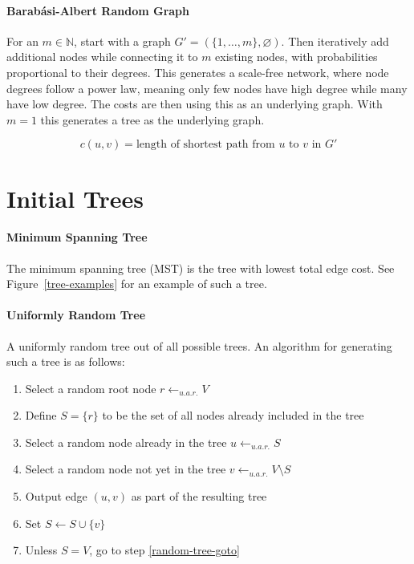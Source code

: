 \documentclass[a4paper, oneside]{discothesis}
\begin{document}
\paragraph{Barabási-Albert Random Graph} For an $m\in\mathbb{N}$, start with a graph $G'=(\{1,\dots,m\},\varnothing)$. Then iteratively add additional nodes while connecting it to $m$ existing nodes, with probabilities proportional to their degrees. This generates a scale-free network, where node degrees follow a power law, meaning only few nodes have high degree while many have low degree. The costs are then using this as an underlying graph. With $m=1$ this generates a tree as the underlying graph.

\begin{equation}
c(u,v)=\text{length of shortest path from $u$ to $v$ in $G'$}
\end{equation}

\section{Initial Trees}
\label{initial-trees}


\paragraph{Minimum Spanning Tree}

The minimum spanning tree (MST) is the tree with lowest total edge cost. See Figure~\ref{tree-examples} for an example of such a tree.

\paragraph{Uniformly Random Tree}

A uniformly random tree out of all possible trees. An algorithm for generating such a tree is as follows:

\begin{enumerate}
\item Select a random root node $r\gets_{u.a.r.}V$
\item Define $S=\{r\}$ to be the set of all nodes already included in the tree
\item Select a random node already in the tree $u\gets_{u.a.r.}S$
\label{random-tree-goto}
\item Select a random node not yet in the tree $v\gets_{u.a.r.}V\setminus S$
\item Output edge $(u,v)$ as part of the resulting tree
\item Set $S\gets S\cup\{v\}$
\item Unless $S=V$, go to step \ref{random-tree-goto}
\end{enumerate}
\end{document}
